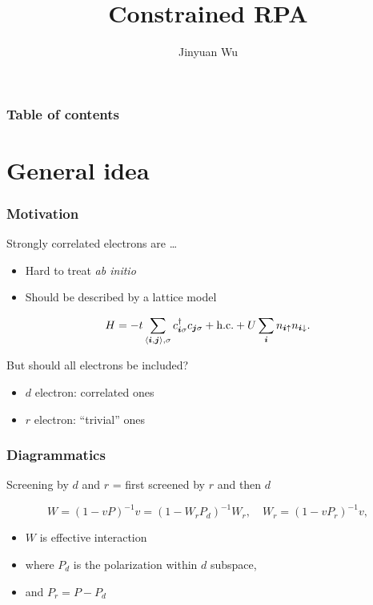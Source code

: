 \documentclass{beamer}
\title{Constrained RPA}
\author{Jinyuan Wu}
\newcommand{\pair}[1]{\langle #1 \rangle}
\newcommand*{\abinitio}{\textit{ab initio}}
\begin{document}
\frame{\titlepage}

\begin{frame}
\frametitle{Table of contents}

\tableofcontents    

\end{frame}

\section{General idea}

\begin{frame}
\frametitle{Motivation}

Strongly correlated electrons are \dots
\begin{itemize}
    \item Hard to treat \abinitio
    \item Should be described by a lattice model
\end{itemize}    

\begin{equation}
    H = - t \sum_{\pair{\vb*{i}, \vb*{j}}, \sigma}
        c^\dagger_{\vb*{i} \sigma} c_{\vb*{j} \sigma}
        + \text{h.c.}
        + U \sum_{\vb*{i}} n_{\vb*{i} \uparrow} n_{\vb*{i} \downarrow}.
\end{equation}

But should all electrons be included?

\begin{itemize}
    \item $d$ electron: correlated ones 
    \item $r$ electron: ``trivial'' ones
\end{itemize}

\end{frame}

\begin{frame}
\frametitle{Diagrammatics}

Screening by $d$ and $r$ = first screened by $r$ and then $d$

\begin{equation}
    W = (1 - v P)^{-1} v = (1 - W_r P_d)^{-1} W_r, \quad 
    W_r = (1 - v P_r)^{-1} v,
\end{equation}
\begin{itemize}
    \item $W$ is effective interaction 
    \item where $P_d$ is the polarization within $d$ subspace,
    \item and $P_r = P - P_d$
\end{itemize}

\begin{center}
    
\end{center}

\end{frame}
\end{document}
